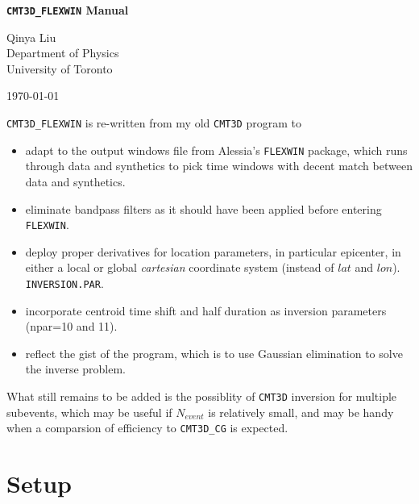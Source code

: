 \documentclass[12pt,titlepage,fleqn]{article}
\begin{document}
\begin{spacing}{1.0} %
\begin{center}

\Large {\vspace{0.1in} \bf \verb+CMT3D_FLEXWIN+ Manual}

\small
Qinya Liu \\
Department of Physics \\
University of Toronto

\today

\end{center}

\end{spacing}

\verb=CMT3D_FLEXWIN= is re-written from my old \verb=CMT3D= program to
\begin{itemize}
\item adapt to the output windows file from Alessia's \verb=FLEXWIN= package, which runs through data and synthetics to pick time windows with decent match between data and synthetics.
\item eliminate bandpass filters as it should have been applied before entering \verb+FLEXWIN+.
\item deploy proper derivatives for location parameters, in particular epicenter, in either a local or global \textit{cartesian} coordinate system (instead of $lat$ and $lon$).  \verb+INVERSION.PAR+.
\item incorporate centroid time shift and half duration as inversion parameters (npar=10 and 11).
\item reflect the gist of the program, which is to use Gaussian elimination to solve the inverse problem.
\end{itemize}
What still remains to be added is the possiblity of \verb+CMT3D+ inversion for multiple subevents, which may be useful if $N_{event}$ is relatively small, and may be handy when a comparsion of efficiency to \verb+CMT3D_CG+ is expected.


\section{Setup}
\end{document}
